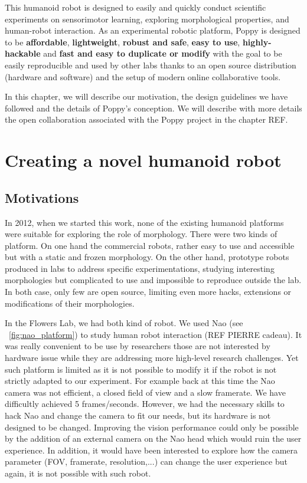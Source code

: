 This humanoid robot is designed to easily and quickly conduct scientific experiments on sensorimotor learning, exploring morphological properties, and human-robot interaction. As an experimental robotic platform, Poppy is designed to be \textbf{affordable}, \textbf{lightweight}, \textbf{robust and safe}, \textbf{easy to use}, \textbf{highly-hackable} and \textbf{fast and easy to duplicate or modify} with the goal to be easily reproducible and used by other labs thanks to an open source distribution (hardware and software) and the setup of modern online collaborative tools.


In this chapter,  we will describe our motivation, the design guidelines we have followed and the details of Poppy's conception. We will describe with more details the open collaboration associated with the Poppy project in the chapter REF.


\section{Creating a novel humanoid robot} %

\subsection{Motivations} %

In 2012, when we started this work, none of the existing humanoid platforms were suitable for exploring the role of morphology. There were two kinds of platform. On one hand the commercial robots, rather easy to use and accessible but with a static and frozen morphology. On the other hand, prototype robots produced in labs to address specific experimentations, studying interesting morphologies but complicated to use and impossible to reproduce outside the lab. In both case, only few are open source, limiting even more hacks, extensions or modifications of their morphologies.

In the Flowers Lab, we had both kind of robot. We used Nao (see \figurename~\ref{fig:nao_platform}) to study human robot interaction (REF PIERRE cadeau). It was really convenient to be use by researchers those are not interested by hardware issue while they are addressing more high-level research challenges. Yet such platform is limited as it is not possible to modify it if the robot is not strictly adapted to our experiment. For example back at this time the Nao camera was not efficient, a closed field of view and a slow framerate. We have difficultly achieved 5 frames/seconds. However, we had the necessary skills to hack Nao and change the camera to fit our needs, but its hardware is not designed to be changed. Improving the vision performance could only be possible by the addition of an external camera on the Nao head which would ruin the user experience. In addition, it would have been interested to explore how the camera parameter (FOV, framerate, resolution,...) can change the user experience but again, it is not possible with such robot.

